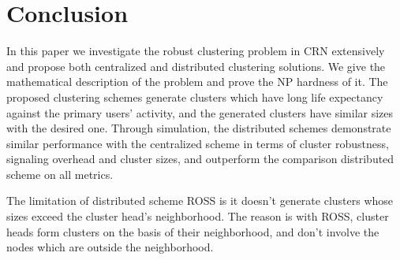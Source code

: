 \documentclass[times]{ettauth}
\theoremstyle{mytheoremstyle}
\theoremstyle{mytheoremstyle}
\theoremstyle{mytheoremstyle}
\begin{document}
\section{Conclusion}
\label{conclusion}
In this paper we investigate the robust clustering problem in CRN extensively and propose both centralized and distributed clustering solutions.
We give the mathematical description of the problem and prove the NP hardness of it.
The proposed clustering schemes generate clusters which have long life expectancy against the primary users' activity, and the generated clusters have similar sizes with the desired one.
Through simulation, the distributed schemes demonstrate similar performance with the centralized scheme in terms of cluster robustness, signaling overhead and cluster sizes, and outperform the comparison distributed scheme on all metrics.

The limitation of distributed scheme ROSS is it doesn't generate clusters whose sizes exceed the cluster head's neighborhood.
The reason is with ROSS, cluster heads form clusters on the basis of their neighborhood, and don't involve the nodes which are outside the neighborhood.









%
\end{document}
